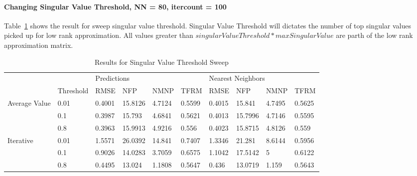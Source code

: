 \paragraph{Changing Singular Value Threshold, NN = 80, itercount = 100}
Table~\ref{tab:SingularValueThresholdSweep} shows the result for sweep singular value threshold. Singular Value Threshold will dictates the number of top singular values picked up for low rank approximation. All values greater than $singularValueThreshold*maxSingularValue$ are parth of the low rank approximation matrix.
\begin{table}[]
\centering
\caption{Results for Singular Value Threshold Sweep}
\label{tab:SingularValueThresholdSweep}
\begin{tabular}{|l|l|l|l|l|l|l|l|l|l|}
\hline
\multirow{2}{*}{}                                              &                          & \multicolumn{4}{l|}{Predictions}   & \multicolumn{4}{l|}{Nearest Neighbors} \\ \cline{2-10} 
                                                               & Threshold & RMSE   & NFP     & NMNP   & TFRM   & RMSE    & NFP      & NMNP    & TFRM    \\ \hline
\multicolumn{1}{|c|}{\multirow{3}{*}{Average Value}} & 0.01      & 0.4001 & 15.8126 & 4.7124 & 0.5599 & 0.4015  & 15.841   & 4.7495  & 0.5625  \\ \cline{2-10} 
\multicolumn{1}{|c|}{}                                         & 0.1       & 0.3987 & 15.793  & 4.6841 & 0.5621 & 0.4013  & 15.7996  & 4.7146  & 0.5595  \\ \cline{2-10} 
\multicolumn{1}{|c|}{}                                         & 0.8       & 0.3963 & 15.9913 & 4.9216 & 0.556  & 0.4023  & 15.8715  & 4.8126  & 0.559   \\ \hline
\multirow{3}{*}{Iterative}                     & 0.01      & 1.5571 & 26.0392 & 14.841 & 0.7407 & 1.3346  & 21.281   & 8.6144  & 0.5956  \\ \cline{2-10} 
                                                               & 0.1       & 0.9026 & 14.0283 & 3.7059 & 0.6575 & 1.1042  & 17.5142  & 5       & 0.6122  \\ \cline{2-10} 
                                                               & 0.8       & 0.4495 & 13.024  & 1.1808 & 0.5647 & 0.436   & 13.0719  & 1.159   & 0.5643  \\ \hline
\end{tabular}
\end{table}

